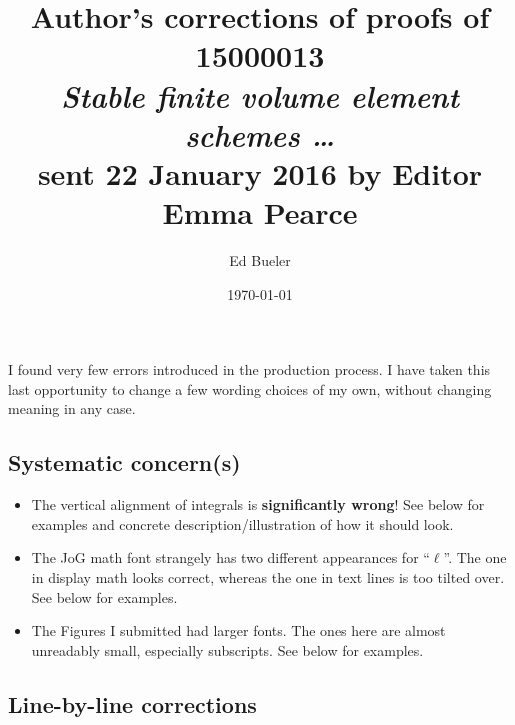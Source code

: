 \documentclass[11pt,reqno]{amsart}
\title{Author's corrections of proofs of 15000013 \\ \emph{Stable finite volume element schemes \dots} \\ sent 22 January 2016 by Editor Emma Pearce}
\author{Ed Bueler}
\date{\today}
\begin{document}
\maketitle

\thispagestyle{empty}

I found very few errors introduced in the production process.  I have taken this last opportunity to change a few wording choices of my own, without changing meaning in any case.

\subsection*{Systematic concern(s)}

\begin{itemize}
\item  The vertical alignment of integrals is \textbf{significantly wrong}!  See below for examples and concrete description/illustration of how it should look.
\item  The JoG math font strangely has two different appearances for ``$\ell$''.  The one in display math looks correct, whereas the one in text lines is too tilted over.  See below for examples.
\item  The Figures I submitted had larger fonts.  The ones here are almost unreadably small, especially subscripts.  See below for examples.
\end{itemize}


\subsection*{Line-by-line corrections}
\end{document}
